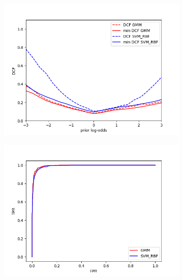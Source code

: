 \documentclass[english]{report}
\begin{document}
\begin{figure}[H]
    \begin{subfigure}{0.5\textwidth}
        \includegraphics[scale=0.5]{../../images/comparison/validation/DCF_GMM&SVM_RBF}
    \end{subfigure}
    \begin{subfigure}{0.5\textwidth}
        \includegraphics[scale=0.5]{../../images/comparison/validation/ROC_GMM&SVM_RBF}
    \end{subfigure}
    \label{fig:SVMvsGMM}
\end{figure}
\end{document}

